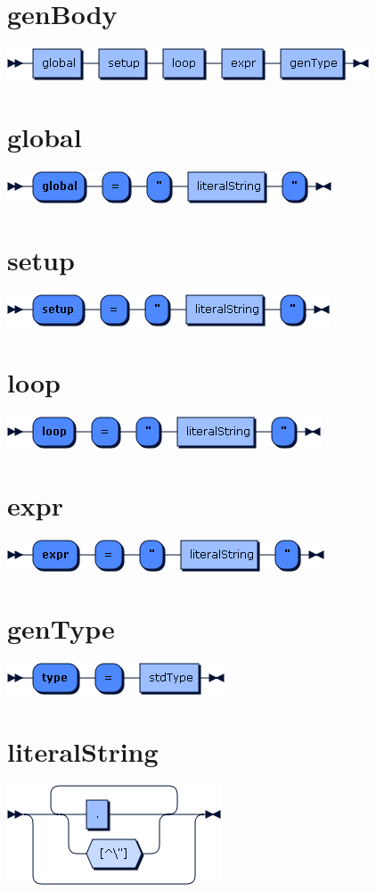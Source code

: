 \begin{appendices}
\section*{genBody}\includegraphics[scale=0.7]{img/ebnf_grammar/genBody}
\section*{global}\includegraphics[scale=0.7]{img/ebnf_grammar/global}
\section*{setup}\includegraphics[scale=0.7]{img/ebnf_grammar/setup}
\section*{loop}\includegraphics[scale=0.7]{img/ebnf_grammar/loop}
\section*{expr}\includegraphics[scale=0.7]{img/ebnf_grammar/expr}
\section*{genType}\includegraphics[scale=0.7]{img/ebnf_grammar/genType}
\section*{literalString}\includegraphics[scale=0.7]{img/ebnf_grammar/literalString}


\end{appendices}
